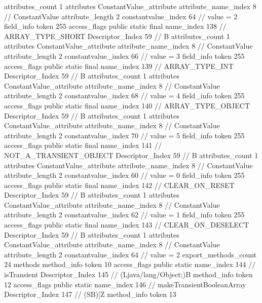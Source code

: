 {{{{{				attributes_count	1
				attributes {
				ConstantValue_attribute {
					attribute_name_index	8		// ConstantValue
					attribute_length	2
					constantvalue_index	64		// value = 2
				}
				}
			}
			field_info {
				token	255
				access_flags	public static final
				name_index	138		// ARRAY_TYPE_SHORT
				Descriptor_Index	59		// B
				attributes_count	1
				attributes {
				ConstantValue_attribute {
					attribute_name_index	8		// ConstantValue
					attribute_length	2
					constantvalue_index	66		// value = 3
				}
				}
			}
			field_info {
				token	255
				access_flags	public static final
				name_index	139		// ARRAY_TYPE_INT
				Descriptor_Index	59		// B
				attributes_count	1
				attributes {
				ConstantValue_attribute {
					attribute_name_index	8		// ConstantValue
					attribute_length	2
					constantvalue_index	68		// value = 4
				}
				}
			}
			field_info {
				token	255
				access_flags	public static final
				name_index	140		// ARRAY_TYPE_OBJECT
				Descriptor_Index	59		// B
				attributes_count	1
				attributes {
				ConstantValue_attribute {
					attribute_name_index	8		// ConstantValue
					attribute_length	2
					constantvalue_index	70		// value = 5
				}
				}
			}
			field_info {
				token	255
				access_flags	public static final
				name_index	141		// NOT_A_TRANSIENT_OBJECT
				Descriptor_Index	59		// B
				attributes_count	1
				attributes {
				ConstantValue_attribute {
					attribute_name_index	8		// ConstantValue
					attribute_length	2
					constantvalue_index	60		// value = 0
				}
				}
			}
			field_info {
				token	255
				access_flags	public static final
				name_index	142		// CLEAR_ON_RESET
				Descriptor_Index	59		// B
				attributes_count	1
				attributes {
				ConstantValue_attribute {
					attribute_name_index	8		// ConstantValue
					attribute_length	2
					constantvalue_index	62		// value = 1
				}
				}
			}
			field_info {
				token	255
				access_flags	public static final
				name_index	143		// CLEAR_ON_DESELECT
				Descriptor_Index	59		// B
				attributes_count	1
				attributes {
				ConstantValue_attribute {
					attribute_name_index	8		// ConstantValue
					attribute_length	2
					constantvalue_index	64		// value = 2
				}
				}
			}
			}
			export_methods_count	24
			methods {
				method_info {
					token	10
					access_flags	public static
					name_index	144		// isTransient
					Descriptor_Index	145		// (Ljava/lang/Object;)B
				}
				method_info {
					token	12
					access_flags	public static
					name_index	146		// makeTransientBooleanArray
					Descriptor_Index	147		// (SB)[Z
				}
				method_info {
					token	13
}}}}}
